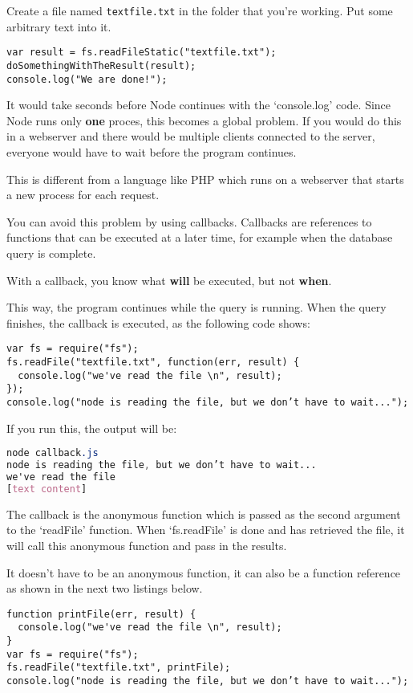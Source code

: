 \documentclass[a4paper]{report}
\begin{document}
Create a file named \texttt{textfile.txt} in the folder that you're working. Put some arbitrary text into it.

\begin{lstlisting} 
var result = fs.readFileStatic("textfile.txt");
doSomethingWithTheResult(result); 
console.log("We are done!"); 
\end{lstlisting}
\noindent It would take seconds before Node continues with the `console.log' code. Since Node runs only \textbf{one} proces, this becomes a global problem. If you would do this in a webserver and there would be multiple clients connected to the server, everyone would have to wait before the program continues.  
 
This is different from a language like PHP which runs on a webserver that starts a new process for each request. 
 
You can avoid this problem by using callbacks. Callbacks are references to functions that can be executed at a later time, for example when the database query is complete.  
 
With a callback, you know what \textbf{will} be executed, but not \textbf{when}. 
 
This way, the program continues while the query is running. When the query finishes, the callback is executed, as the following code shows: 
 
\begin{lstlisting} 
var fs = require("fs");
fs.readFile("textfile.txt", function(err, result) {
  console.log("we've read the file \n", result);
});
console.log("node is reading the file, but we don’t have to wait...");
\end{lstlisting} 

If you run this, the output will be: 
\begin{lstlisting}[language=css] 
node callback.js
node is reading the file, but we don’t have to wait...
we've read the file
[text content]
\end{lstlisting} 
 
 
\noindent The callback is the anonymous function which is passed as the second argument to the `readFile' function. When `fs.readFile' is done and has retrieved the file, it will call this anonymous function and pass in the results. 
 
It doesn't have to be an anonymous function, it can also be a function reference as shown in the next two listings below. 
 
\begin{lstlisting} 
function printFile(err, result) {
  console.log("we've read the file \n", result);
}
var fs = require("fs");
fs.readFile("textfile.txt", printFile);
console.log("node is reading the file, but we don’t have to wait...");
\end{lstlisting} 
 
\end{document}

